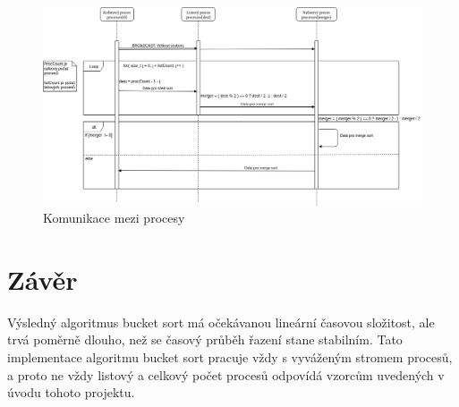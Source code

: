 \documentclass[11pt,a4paper,titlepage]{article}
\begin{document}
        \begin{figure}[H]
            \includegraphics[width=1\linewidth]{sequenceDiagram.png}
            \caption{Komunikace mezi procesy}
        \end{figure}
    
	\section{Závěr}
        Výsledný algoritmus bucket sort má očekávanou lineární časovou složitost, ale trvá poměrně dlouho, než se časový průběh řazení stane stabilním. Tato
        implementace algoritmu bucket sort pracuje vždy s vyváženým stromem procesů, a proto ne vždy listový a celkový počet procesů odpovídá vzorcům
        uvedených v úvodu tohoto projektu.
\end{document}
